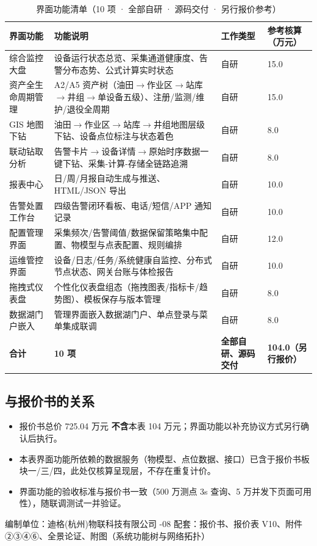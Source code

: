 \documentclass[11pt,a4paper]{ctexart}
\begin{document}
\begin{table}[H]\centering
\caption{界面功能清单（10 项 · 全部自研 · 源码交付 · 另行报价参考）}
\begin{tabular}{p{3.2cm} p{5.8cm} p{2.0cm} p{1.8cm}}
\toprule
\textbf{界面功能} & \textbf{功能说明} & \textbf{工作类型} & \textbf{参考核算（万元）} \\
\midrule
综合监控大盘 & 设备运行状态总览、采集通道健康度、告警分布态势、公式计算实时状态 & 自研 & 15.0 \\
资产全生命周期管理 & A2/A5 资产树（油田$\rightarrow$作业区$\rightarrow$站库$\rightarrow$井组$\rightarrow$单设备五级）、注册/监测/维护/退役全周期 & 自研 & 15.0 \\
GIS 地图下钻 & 油田$\rightarrow$作业区$\rightarrow$站库$\rightarrow$井组地图层级下钻、设备点位标注与状态着色 & 自研 & 8.0 \\
联动钻取分析 & 告警卡片$\rightarrow$设备详情$\rightarrow$原始时序数据一键下钻、采集-计算-存储全链路追溯 & 自研 & 8.0 \\
报表中心 & 日/周/月报自动生成与推送、HTML/JSON 导出 & 自研 & 10.0 \\
告警处置工作台 & 四级告警闭环看板、电话/短信/APP 通知记录 & 自研 & 10.0 \\
配置管理界面 & 采集频次/告警阈值/数据保留策略集中配置、物模型与点表配置、规则编排 & 自研 & 12.0 \\
运维管控界面 & 设备/日志/任务/系统健康自监控、分布式节点状态、网关台账与体检报告 & 自研 & 10.0 \\
拖拽式仪表盘 & 个性化仪表盘组态（拖拽图表/指标卡/趋势图）、模板保存与版本管理 & 自研 & 8.0 \\
数据湖门户嵌入 & 管理界面嵌入数据湖门户、单点登录与菜单集成联调 & 自研 & 8.0 \\
\midrule
\textbf{合计} & \textbf{10 项} & \textbf{全部自研、源码交付} & \textbf{104.0（另行报价）} \\
\bottomrule
\end{tabular}
\end{table}

\subsection{与报价书的关系}

\begin{itemize}[leftmargin=*]
  \item 报价书总价 725.04 万元 \textbf{不含}本表 104 万元；界面功能以补充协议方式另行确认后执行。
  \item 本表界面功能所依赖的数据服务（物模型、点位数据、接口）已含于报价书板块一/三/四，此处仅核算呈现层，不存在重复计价。
  \item 界面功能的验收标准与报价书一致（500 万测点 3s 查询、5 万并发下页面可用性），随联调测试一并验证。
\end{itemize}

\vspace{1em}
\noindent\hrulefill

\begin{center}
\small 编制单位：迪格(杭州)物联科技有限公司 -08 \quad 配套：报价书、报价表 V10、附件②③④⑥、全景论证、附图（系统功能树与网络拓扑）
\end{center}
\end{document}

